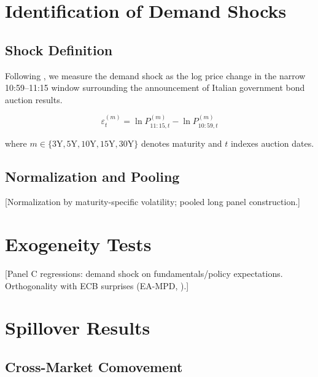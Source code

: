 \documentclass[12pt]{article}
\begin{document}
\section{Identification of Demand Shocks}
\label{sec:identification}

\subsection{Shock Definition}

Following \citet{Lengyel2021_demand_shocks}, we measure the demand shock as the
log price change in the narrow 10:59--11:15 window surrounding the announcement
of Italian government bond auction results.

\[
  \varepsilon_t^{(m)} = \ln P_{11:15,t}^{(m)} - \ln P_{10:59,t}^{(m)}
\]

where $m \in \{3\text{Y}, 5\text{Y}, 10\text{Y}, 15\text{Y}, 30\text{Y}\}$
denotes maturity and $t$ indexes auction dates.

\subsection{Normalization and Pooling}

[Normalization by maturity-specific volatility; pooled long panel construction.]

\section{Exogeneity Tests}
\label{sec:exogeneity}

[Panel C regressions: demand shock on fundamentals/policy expectations.
Orthogonality with ECB surprises (EA-MPD, \citealt{Altavilla2019_eampd}).]

\section{Spillover Results}
\label{sec:spillovers}

\subsection{Cross-Market Comovement}
\end{document}
